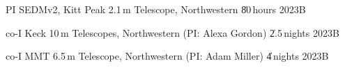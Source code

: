 


\begin{cventries}

\cvsimpentry
	{PI}
	{SEDMv2, Kitt Peak 2.1\,m Telescope, Northwestern \| 80\,hours}
	{2023B}
	{}

\cvsimpentry
	{co-I}
	{Keck 10\,m Telescopes, Northwestern (PI: Alexa Gordon) \| 2.5\,nights}
	{2023B}
	{}

\cvsimpentry
	{co-I}
	{MMT 6.5\,m Telescope, Northwestern (PI: Adam Miller) \| 4\,nights}
	{2023B}
	{}


\end{cventries}